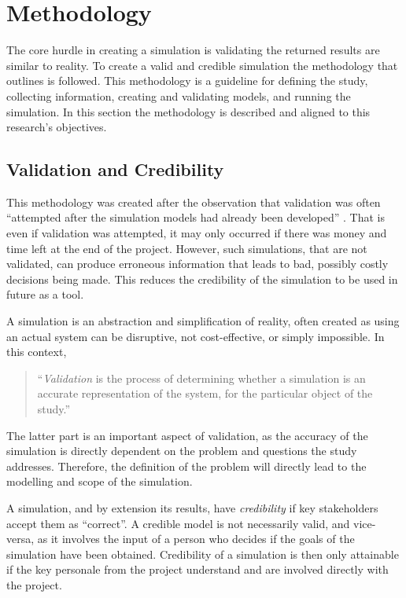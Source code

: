 \section{Methodology}
The core hurdle in creating a simulation is validating the returned results are similar to reality.
To create a valid and credible simulation the methodology that \citep{Law2005} outlines is followed.
This methodology is a guideline for defining the study, collecting information, creating and validating models, and running the simulation.
In this section the methodology is described and aligned to this research's objectives. 

\subsection{Validation and Credibility}
This methodology was created after the observation that validation was often ``attempted after the simulation models had already been developed'' \citep{Law2005}.
That is even if validation was attempted, it may only occurred if there was money and time left at the end of the project.
However, such simulations, that are not validated, can produce erroneous information that leads to bad, possibly costly decisions being made.
This reduces the credibility of the simulation to be used in future as a tool.

A simulation is an abstraction and simplification of reality, often created as using an actual system can be disruptive, not cost-effective, or simply impossible.
In this context,

\begin{quotation}
``\textit{Validation} is the process of determining whether a simulation is an accurate representation of the system, for the particular object of the study.'' \citep{Law2005}
\end{quotation}

The latter part is an important aspect of validation, as the accuracy of the simulation is directly dependent on the problem and questions the study addresses.
Therefore, the definition of the problem will directly lead to the modelling and scope of the simulation.

A simulation, and by extension its results, have \textit{credibility} if key stakeholders accept them as ``correct''.
A credible model is not necessarily valid, and vice-versa, as it involves the input of a person who decides if the goals of the simulation have been obtained.
Credibility of a simulation is then only attainable if the key personale from the project understand and are involved directly with the project.

